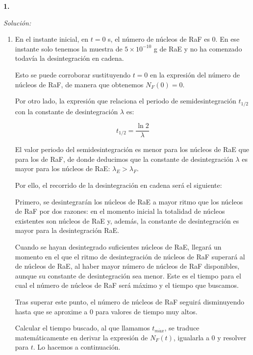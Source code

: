 \textbf{1.}


\vspace{20px}
\textit{Solución:}
\\

\begin{enumerate}
[label=\alph*)]
    \item En el instante inicial, en $t = 0$ s, el número de núcleos de RaF es 0. En ese instante solo tenemos la muestra de $5 \times 10^{-10}$ g de RaE y no
    ha comenzado todavía la desintegración en cadena.

    Esto se puede corroborar sustituyendo $t = 0$ en la expresión del número de núcleos de RaF, de manera que obtenemos $N_F(0) = 0$.

    Por otro lado, la expresión que relaciona el periodo de semidesintegración $t_{1/2}$ con la constante de desintegración $\lambda$ es:

    \begin{equation*}
        t_{1/2} = \frac{\ln 2}{\lambda}
    \end{equation*}

    El valor periodo del semidesintegración es menor para los núcleos de RaE que para los de RaF, de donde deducimos que la constante de desintegración
    $\lambda$ es mayor para los núcleos de RaE:
    $\lambda_{E} > \lambda_{F}$.

    Por ello, el recorrido de la desintegración en cadena será el siguiente:

    Primero, se desintegrarán los núcleos de RaE a mayor ritmo que los núcleos de RaF por dos razones: en el momento inicial la totalidad de núcleos existentes son
    núcleos de RaE y, además, la constante de desintegración es mayor para la desintegración RaE.

    Cuando se hayan desintegrado suficientes núcleos de RaE, llegará un momento en el que el ritmo de desintegración de núcleos de RaF superará al de núcleos de RaE, al haber mayor número de
    núcleos de RaF disponibles, aunque su constante de desintegración sea menor. Este es el tiempo para el cual el número de núcleos de RaF será máximo y el tiempo que
    buscamos.

    Tras superar este punto, el número de núcleos de RaF seguirá disminuyendo hasta que se aproxime a 0 para valores de tiempo muy altos.

    Calcular el tiempo buscado, al que llamamos $t_{m\acute{a}x}$,
    se traduce matemáticamente en derivar la expresión de $N_F (t)$, igualarla a 0 y resolver para $t$. Lo hacemos a continuación.


\end{enumerate}
